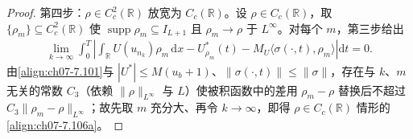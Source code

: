 \documentclass[../../main.tex]{subfiles}%
\begin{document}
\begin{proof}
第四步：$\rho\in C^2_c(\mathbb{R})$ 放宽为 $C_c(\mathbb{R})$。设 $\rho\in C_c(\mathbb{R})$，取 $\{\rho_m\}\subseteq C^2_c(\mathbb{R})$ 使 $\operatorname{supp}\rho_m\subseteq I_{L+1}$ 且 $\rho_m\to\rho$ 于 $L^\infty$。对每个 $m$，第三步给出
\begin{align*}
\lim_{k\to\infty}\int_0^T\left|\int_{\mathbb{R}}U(u_{n_k})\rho_m\,\mathrm{d}x-U_{\rho_m}^*(t)-M_U\langle\sigma(\cdot,t),\rho_m\rangle\right|\mathrm{d}t=0.
\end{align*}
由\eqref{align:ch07-7.101}与 $|U^*|\leqslant M(u_b+1)$、$\|\sigma(\cdot,t)\|\leqslant\|\sigma\|$，存在与 $k$、$m$ 无关的常数 $C_3$（依赖 $\|\rho\|_{L^\infty}$ 与 $L$）使被积函数中的差用 $\rho_m-\rho$ 替换后不超过 $C_3\|\rho_m-\rho\|_{L^\infty}$；故先取 $m$ 充分大、再令 $k\to\infty$，即得 $\rho\in C_c(\mathbb{R})$ 情形的\eqref{align:ch07-7.106a}。
\end{proof}
\end{document}
